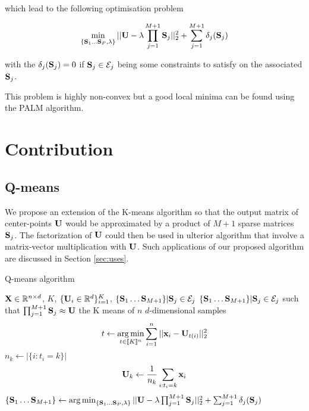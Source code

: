 \documentclass{article}
\begin{document}
which lead to the following optimisation problem

\begin{equation}
\min_{\{{\mathbf{S}}_1 \dots {\mathbf{S}}_P, \lambda\}} ||{\mathbf{U}} - \lambda \prod_{j=1}^{M+1}{{\mathbf{S}}_j}||_2^2 + \sum_{j=1}^{M+1} \delta_j({\mathbf{S}}_j)
\end{equation}

with the $\delta_j({\mathbf{S}}_j) = 0$ if ${\mathbf{S}}_j \in \mathcal{E}_j$ being some constraints to satisfy on the associated ${\mathbf{S}}_j$.

This problem is highly non-convex but a good local minima can be found using the PALM algorithm.


\section{Contribution}

\subsection{Q-means}

We propose an extension of the K-means algorithm so that the output matrix of center-points ${\mathbf{U}}$ would be approximated by a product of $M+1$ sparse matrices ${\mathbf{S}}_j$. The factorization of ${\mathbf{U}}$ could then be used in ulterior algorithm that involve a matrix-vector multiplication with ${\mathbf{U}}$. Such applications of our proposed algorithm are discussed in Section \ref{sec:uses}.

\begin{algorithm}
\caption{Q-means algorithm}
\begin{algorithmic}


\REQUIRE ${\mathbf{X}} \in \mathbb{R}^{n \times d}$, $K$, $\{{\mathbf{U}}_i \in \mathbb{R}^d\}_{i=1}^{K}$, $\{{\mathbf{S}}_1 \dots {\mathbf{S}}_{M+1}\}|{\mathbf{S}}_j \in \mathcal{E}_j$
\ENSURE $\{{\mathbf{S}}_1 \dots {\mathbf{S}}_{M+1}\}|{\mathbf{S}}_j \in \mathcal{E}_j$ such that $\prod_{j=1}^{M+1}{\mathbf{S}}_j \approx {\mathbf{U}}$ the K means of $n$ $d$-dimensional samples
\REPEAT
\STATE \begin{equation}
\label{eq:kmeans_assign_step}
t \leftarrow \operatorname*{arg\,min}_{t \in [\![K]\!]^n} \sum_{i=1}^{n} {||{\mathbf{x}}_i - {\mathbf{U}}_{t(i)}||_2^2}
\end{equation}
\STATE $n_k \leftarrow |\{i: t_i=k\}|$
\STATE \begin{equation}
\label{eq:kmeans_compute_step}
{\mathbf{U}}_k \leftarrow \frac{1}{n_k} \sum_{i: t_i = k} {{\mathbf{x}}_i}
\end{equation}
\STATE $\{{\mathbf{S}}_1 \dots {\mathbf{S}}_{M+1}\} \leftarrow \operatorname*{arg\,min}_{\{{\mathbf{S}}_1 \dots {\mathbf{S}}_P, \lambda\}} ||{\mathbf{U}} - \lambda \prod_{j=1}^{M+1}{{\mathbf{S}}_j}||_2^2 + \sum_{j=1}^{M+1} \delta_j({\mathbf{S}}_j)$
\ENDFOR
{}
\end{algorithmic}
\end{algorithm}
\end{document}
